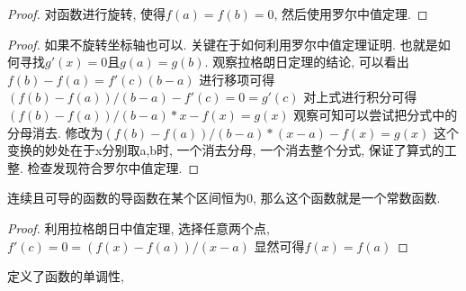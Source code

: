 \begin{proof}
    对函数进行旋转, 使得$f(a) = f(b) = 0$, 然后使用罗尔中值定理.
\end{proof}

\begin{proof}
    如果不旋转坐标轴也可以. 关键在于如何利用罗尔中值定理证明. 也就是如何寻找$g'(x) = 0$且$g(a) = g(b)$. 
    观察拉格朗日定理的结论, 可以看出$f(b) - f(a) = f'(c)(b - a)$
    进行移项可得$( f(b) - f(a))/(b -a) - f'(c) = 0 = g'(c)$
    对上式进行积分可得$( f(b) - f(a))/(b -a)*x - f(x) = g(x)$
    观察可知可以尝试把分式中的分母消去. 修改为$( f(b) - f(a))/(b -a)*(x - a)- f(x) = g(x)$
    这个变换的妙处在于x分别取a,b时, 一个消去分母, 一个消去整个分式, 保证了算式的工整. 
    检查发现符合罗尔中值定理. 
\end{proof}

\begin{corollary}
    连续且可导的函数的导函数在某个区间恒为0, 那么这个函数就是一个常数函数.
\end{corollary}

\begin{proof}
    利用拉格朗日中值定理, 选择任意两个点, $f'(c) = 0 = (f(x) - f(a))/(x - a) $
    显然可得$f(x) = f(a)$
\end{proof}

\begin{corollary}
    定义了函数的单调性, 
\end{corollary}